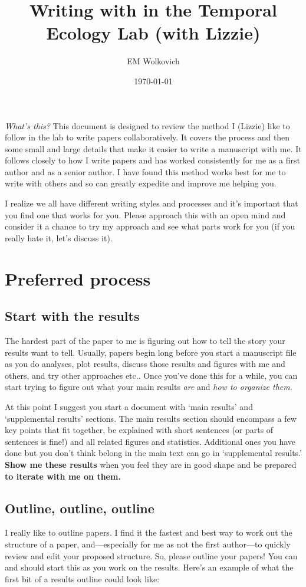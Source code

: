 \documentclass[11pt,letter]{article}
\title{Writing with in the Temporal Ecology Lab (with Lizzie)}
\author{EM Wolkovich}
\date{\today}
\begin{document}
\maketitle

\emph{What's this?} This document is designed to review the method I (Lizzie) like to follow in the lab to write papers collaboratively. It covers the process and then some small and large details that make it easier to write a manuscript with me. It follows closely to how I write papers and has worked consistently for me as a first author and as a senior author. I have found this method works best for me to write with others and so can greatly expedite and improve me helping you. 

I realize we all have different writing styles and processes and it's important that you find one that works for you. Please approach this with an open mind and consider it a chance to try my approach and see what parts work for you (if you really hate it, let's discuss it).

\tableofcontents

\section{Preferred process}
\subsection{Start with the results}
The hardest part of the paper to me is figuring out how to tell the story your results want to tell. Usually, papers begin long before you start a manuscript file as you do analyses, plot results, discuss those results and figures with me and others, and try other approaches etc.. Once you've done this for a while, you can start trying to figure out what your main results \emph{are} and \emph{how to organize them}. 

At this point I suggest you start a document with `main results' and `supplemental results' sections. The main results section should encompass a few key points that fit together, be explained with short sentences (or parts of sentences is fine!) and all related figures and statistics. Additional ones you have done but you don't think belong in the main text can go in  `supplemental results.' {\bf Show me these results} when you feel they are in good shape and be prepared {\bf to iterate with me on them.}
\subsection{Outline, outline, outline}
I really like to outline papers. I find it the fastest and best way to work out the structure of a paper, and---especially for me as not the first author---to quickly review and edit your proposed structure. So, please outline your papers! You can and should start this as you work on the results. Here's an example of what the first bit of a results outline could look like:
\end{document}
